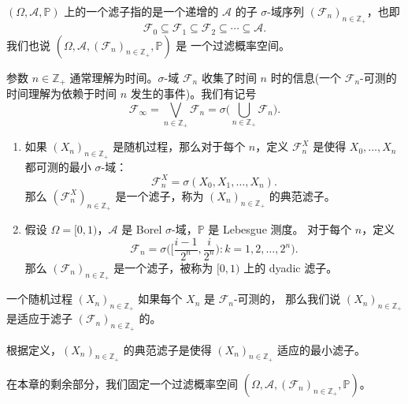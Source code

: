 \documentclass[fontset=none]{Notes}
\begin{document}
\begin{definition}
  $(\Omega,\mathcal{A},\mathbb{P})$ 上的一个滤子指的是一个递增的 $\mathcal{A}$
  的子 $\sigma$-域序列 $(\mathcal{F}_n)_{n\in \mathbb{Z}_+}$，也即
  \[
    \mathcal{F}_0\subseteq \mathcal{F}_1\subseteq \mathcal{F}_2\subseteq \cdots \subseteq \mathcal{A}.
  \]
  我们也说 $(\Omega,\mathcal{A},(\mathcal{F}_n)_{n\in \mathbb{Z}_+},\mathbb{P})$ 是
  一个过滤概率空间。
\end{definition}

参数 $n\in \mathbb{Z}_+$ 通常理解为时间。$\sigma$-域 $\mathcal{F}_n$
收集了时间 $n$ 时的信息(一个 $\mathcal{F}_n$-可测的时间理解为依赖于时间 $n$
发生的事件)。我们有记号
\[
  \mathcal{F}_\infty=\bigvee_{n\in \mathbb{Z}_+}\mathcal{F}_n=\sigma\biggl(
    \bigcup_{n\in \mathbb{Z}_+}\mathcal{F}_n
  \biggr).
\]  

\begin{example}\label{exa:filtration}
  \mbox{}
  \begin{enumerate}
    \item 如果 $(X_n)_{n\in \mathbb{Z}_+}$ 是随机过程，那么对于每个 $n$，定义
    $\mathcal{F}_n^X$ 是使得 $X_0,\dots,X_n$ 都可测的最小 $\sigma$-域：
    \[
      \mathcal{F}_n^X=\sigma(X_0,X_1,\dots,X_n).
    \]
    那么 $(\mathcal{F}_n^X)_{n\in \mathbb{Z}_+}$ 是一个滤子，称为
    $(X_n)_{n\in \mathbb{Z}_+}$ 的典范滤子。
    \item 假设 $\Omega=[0,1)$，$\mathcal{A}$ 是 Borel $\sigma$-域，$\mathbb{P}$ 是 Lebesgue 测度。
    对于每个 $n$，定义
    \[
      \mathcal{F}_n=\sigma\biggl(
        \biggl[\frac{i-1}{2^n},\frac{i}{2^n}\biggr):k=1,2,\dots,2^n
      \biggr).
    \]
    那么 $(\mathcal{F}_n)_{n\in \mathbb{Z}_+}$ 是一个滤子，被称为
    $[0,1)$ 上的 dyadic 滤子。
  \end{enumerate}
\end{example}

\begin{definition}
  一个随机过程 $(X_n)_{n\in \mathbb{Z}_+}$ 如果每个 $X_n$ 是 $\mathcal{F}_n$-可测的，
  那么我们说 $(X_n)_{n\in \mathbb{Z}_+}$ 是适应于滤子 $(\mathcal{F}_n)_{n\in \mathbb{Z}_+}$ 的。
\end{definition}

根据定义，$(X_n)_{n\in \mathbb{Z}_+}$ 的典范滤子是使得
$(X_n)_{n\in \mathbb{Z}_+}$ 适应的最小滤子。

在本章的剩余部分，我们固定一个过滤概率空间
$(\Omega,\mathcal{A},(\mathcal{F}_n)_{n\in \mathbb{Z}_+},\mathbb{P})$。
\end{document}
